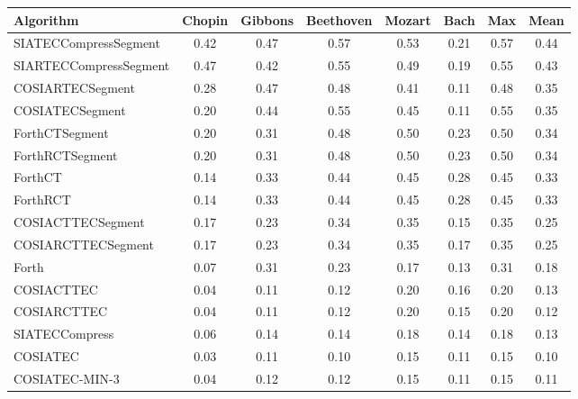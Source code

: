 \documentclass{article}
\begin{document}
\begin{table}
\centering
\begin{tabular}{lccccccc}\hline
Algorithm& Chopin&Gibbons& Beethoven& Mozart& Bach& Max& Mean\\\hline
SIATECCompressSegment&0.42&0.47&0.57&0.53&0.21&0.57&0.44\\
SIARTECCompressSegment&0.47&0.42&0.55&0.49&0.19&0.55&0.43\\
COSIARTECSegment&0.28&0.47&0.48&0.41&0.11&0.48&0.35\\
COSIATECSegment&0.20&0.44&0.55&0.45&0.11&0.55&0.35\\
ForthCTSegment&0.20&0.31&0.48&0.50&0.23&0.50&0.34\\
ForthRCTSegment&0.20&0.31&0.48&0.50&0.23&0.50&0.34\\
ForthCT&0.14&0.33&0.44&0.45&0.28&0.45&0.33\\
ForthRCT&0.14&0.33&0.44&0.45&0.28&0.45&0.33\\
COSIACTTECSegment&0.17&0.23&0.34&0.35&0.15&0.35&0.25\\
COSIARCTTECSegment&0.17&0.23&0.34&0.35&0.17&0.35&0.25\\
Forth&0.07&0.31&0.23&0.17&0.13&0.31&0.18\\
COSIACTTEC&0.04&0.11&0.12&0.20&0.16&0.20&0.13\\
COSIARCTTEC&0.04&0.11&0.12&0.20&0.15&0.20&0.12\\
SIATECCompress&0.06&0.14&0.14&0.18&0.14&0.18&0.13\\
COSIATEC&0.03&0.11&0.10&0.15&0.11&0.15&0.10\\
COSIATEC-MIN-3&0.04&0.12&0.12&0.15&0.11&0.15&0.11\\
\hline
\end{tabular}
\end{table}
\end{document}
